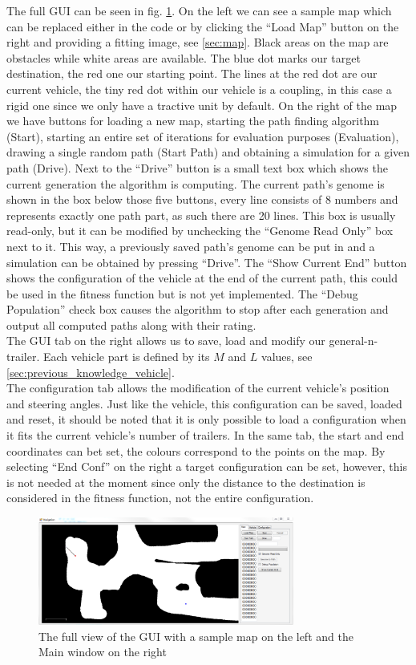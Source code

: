 The full GUI can be seen in fig. \ref{pic:gui_full_main}. On the left we can see a sample map which can be replaced either in the code or by clicking the "`Load Map"' button on the right and providing a fitting image, see \ref{sec:map}. Black areas on the map are obstacles while white areas are available. The blue dot marks our target destination, the red one our starting point. The lines at the red dot are our current vehicle, the tiny red dot within our vehicle is a coupling, in this case a rigid one since we only have a tractive unit by default. On the right of the map we have buttons for loading a new map, starting the path finding algorithm (Start), starting an entire set of iterations for evaluation purposes (Evaluation), drawing a single random path (Start Path) and obtaining a simulation for a given path (Drive). Next to the "`Drive"' button is a small text box which shows the current generation the algorithm is computing. The current path's genome is shown in the box below those five buttons, every line consists of 8 numbers and represents exactly one path part, as such there are 20 lines. This box is usually read-only, but it can be modified by unchecking the "`Genome Read Only"' box next to it. This way, a previously saved path's genome can be put in and a simulation can be obtained by pressing "`Drive"'. The "`Show Current End"' button shows the configuration of the vehicle at the end of the current path, this could be used in the fitness function but is not yet implemented. The "`Debug Population"' check box causes the algorithm to stop after each generation and output all computed paths along with their rating. \\
The GUI tab on the right allows us to save, load and modify our general-n-trailer. Each vehicle part is defined by its $M$ and $L$ values, see \ref{sec:previous_knowledge_vehicle}. \\
The configuration tab allows the modification of the current vehicle's position and steering angles. Just like the vehicle, this configuration can be saved, loaded and reset, it should be noted that it is only possible to load a configuration when it fits the current vehicle's number of trailers. In the same tab, the start and end coordinates can bet set, the colours correspond to the points on the map. By selecting "`End Conf"' on the right a target configuration can be set, however, this is not needed at the moment since only the distance to the destination is considered in the fitness function, not the entire configuration.

\begin{figure}[b]
\centering
\includegraphics[width=0.75\textwidth]{./Chapters/Figures/gui_full_main.png}
\caption{The full view of the GUI with a sample map on the left and the Main window on the right\label{pic:gui_full_main}}
\end{figure}
